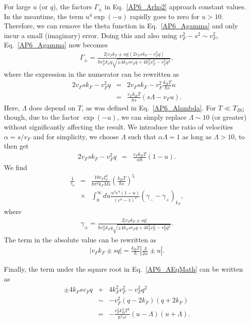 For large $u$ (or $q$), the factors $\Gamma_\pm$ in Eq.~\eqref{AP6_Arho2} approach constant values. In the meantime, the term $u^4\exp({-u})$ rapidly goes to zero for $u>10$.
%
Therefore, we can remove the theta function in Eq.~\eqref{AP6_Agamma} and only incur a small (imaginary) error. Doing this and also using $v_F^2-s^2\sim v_F^2$, Eq.~\eqref{AP6_Agamma} now becomes
%
\begin{eqnarray}
\label{AP6_Agamma2}
\Gamma_\pm=\frac{2|v_Fk_F\pm sq|(2v_Fsk_F-v_F^2q)}{\hbar v_F^3k_F q\sqrt{\pm 4k_Fsv_Fq+4k_F^2v_F^2-v_F^2q^2}},
\end{eqnarray}
%
where the expression in the numerator can be rewritten as
\begin{eqnarray}
2v_Fsk_F-v_F^2q&=&2v_Fsk_F-v_F^2\frac{k_BT}{\hbar s}u\nonumber\\
&=&\frac{v_Fk_BT}{\hbar s}(s\Lambda-v_Fu).
\end{eqnarray}
%
Here, $\Lambda$ does depend on $T$, as was defined in Eq.~\eqref{AP6_Alambda}. For $T\ll T_{BG}$ though, due to the factor $\exp({-u})$, we can simply replace $\Lambda\sim 10$ (or greater) without significantly affecting the result. 
%
We introduce the ratio of velocities $\alpha=s/v_F$ and for simplicity, we choose $\Lambda$ such that $\alpha\Lambda=1$ as long as $\Lambda>10$, to then get
%
\begin{eqnarray}
2v_Fsk_F-v_F^2q
&=&\frac{v_Fk_BT}{\alpha\hbar }(1-u).
\end{eqnarray}
%
We find
%
\begin{eqnarray}
\frac{1}{\tau_0}&=&\frac{10v_F\xi_I^2}{8\pi^2k_FMs}\left(\frac{k_BT}{\hbar s}\right)^5\nonumber\\
&\times&\int_0^\infty du \frac{u^4e^u(1-u)}{(e^u-1)^2}(\gamma_--\gamma_+)_{k_F},
\end{eqnarray}
%
where
%
\begin{eqnarray}
\label{AP6_AEqMath}
\gamma_\pm=\frac{2|v_Fk_F\pm sq|}{\hbar v_F^3k_F q\sqrt{\pm 4k_Fsv_Fq+4k_F^2v_F^2-v_F^2q^2}}.
\end{eqnarray}
%
The term in the absolute value can be rewritten as
%
\begin{eqnarray}
|v_Fk_F\pm sq|=\frac{k_BT}{\hbar}\left|\frac{\Lambda}{2\alpha}\pm u\right|.
\end{eqnarray}
%

Finally, the term under the square root in Eq.~\eqref{AP6_AEqMath} can be written as 
%
\begin{eqnarray}
\nonumber
\pm 4k_Fsv_Fq&+&4k_F^2v_F^2-v_F^2q^2\nonumber\\
&\sim&-v_F^2(q-2k_F)(q+2k_F)\nonumber\\
&=&-\frac{v_F^2k_B^2T^2}{\hbar^2s^2}(u-\Lambda)(u+\Lambda).
\end{eqnarray}
%


